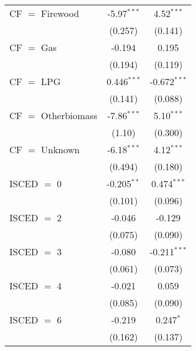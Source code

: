 \begin{table}[htbp!]
\begin{adjustbox}{width = 1\textwidth, max height = 0.95\textheight, center}
\begin{threeparttable}[b]
\begin{tabular}{lcc}
            CF $=$ Firewood                               & -5.97$^{***}$ & 4.52$^{***}$\\   
                                                          & (0.257)       & (0.141)\\   
            CF $=$ Gas                                    & -0.194        & 0.195\\   
                                                          & (0.194)       & (0.119)\\   
            CF $=$ LPG                                    & 0.446$^{***}$ & -0.672$^{***}$\\   
                                                          & (0.141)       & (0.088)\\   
            CF $=$ Otherbiomass                           & -7.86$^{***}$ & 5.10$^{***}$\\   
                                                          & (1.10)        & (0.300)\\   
            CF $=$ Unknown                                & -6.18$^{***}$ & 4.12$^{***}$\\   
                                                          & (0.494)       & (0.180)\\   
            ISCED $=$ 0                                   & -0.205$^{**}$ & 0.474$^{***}$\\   
                                                          & (0.101)       & (0.096)\\   
            ISCED $=$ 2                                   & -0.046        & -0.129\\   
                                                          & (0.075)       & (0.090)\\   
            ISCED $=$ 3                                   & -0.080        & -0.211$^{***}$\\   
                                                          & (0.061)       & (0.073)\\   
            ISCED $=$ 4                                   & -0.021        & 0.059\\   
                                                          & (0.085)       & (0.090)\\   
            ISCED $=$ 6                                   & -0.219        & 0.247$^{*}$\\   
                                                          & (0.162)       & (0.137)\\   

\end{tabular}
\end{threeparttable}
\end{adjustbox}
\end{table}
